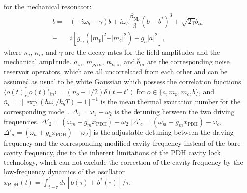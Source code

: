 \documentclass[aps,prl,twocolumn,superscriptaddress]{revtex4-2}
\begin{document}
for the mechanical resonator:
\begin{equation}
\begin{split}
\dot{b}=&\left(-i\omega_{b}-\gamma\right)b+i\omega_{b}\dfrac{\beta_{\text{NL}}}{3} \left(b-b^*\right)^3 +\sqrt{2\gamma}b_{in}\\+&i\left[g_m (\vert m_p\vert^2+\vert m_c\vert^2)-g_a \vert a\vert^2\right],
\end{split}
\label{eq:cle equationb}
\end{equation}
where $\kappa_a$, $\kappa_m$ and $\gamma$ are the decay rates for the field amplitudes and the mechanical amplitude. ${a}_{in}$, ${m}_{p,in}$, ${m}_{c,in}$ and $\hat{b}_{in}$ are the corresponding noise reservoir operators, which are all uncorrelated from each other and can be assumed as usual to be white Gaussian which possess the correlation functions $\langle o(t)_{in}^{*} o(t)'_{in}\rangle=(\bar{n}_o+1/2)\delta(t-t')$ for $o\in\{a,m_p,m_c,b\}$, and $\bar{n}_o=[\exp(\hbar\omega_o/k_bT)-1]^{-1}$ is the mean thermal excitation number for the corresponding mode~\cite{Giovannetti2001}. $\Delta_1=\omega_1-\omega_2$ is the detuning between the two driving frequencies. $\Delta'_{2}=(\omega_{m}-g_{m}x_{\text{PDH}})-\omega_{2}$ [$\Delta'_{c}=(\omega_{m}-g_{m}x_{\text{PDH}})-\omega_{c}$, $\Delta'_{a}=(\omega_{a}+g_{a}x_{\text{PDH}})-\omega_{A}$] is the adjustable detuning between the driving frequency and the corresponding modified cavity frequency instead of the bare cavity frequency, due to the inherent limitations of the PDH cavity lock technology, which can not exclude the correction of the cavity frequency by the low-frequency dynamics of the oscillator $x_{\text{PDH}}(t)=\int_{t-\tau}^td\tau[b(\tau)+b^*(\tau)]/{\tau}$. 
\end{document}
